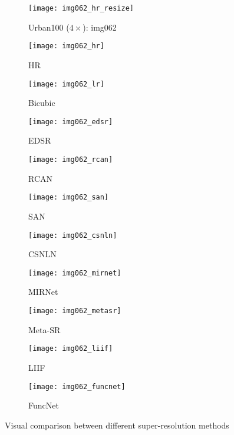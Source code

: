 \documentclass{article}
\begin{document}
{\begin{figure}
\begin{minipage}{1\textwidth}
\begin{minipage}{0.30\textwidth}
\begin{subfigure}{0.98\columnwidth}
\texttt{[image: img062\_hr\_resize]}
\caption*{Urban100 ($4\times$): img062}
\end{subfigure}
\end{minipage}
\begin{minipage}{0.70\textwidth}
\begin{subfigure}{0.19\columnwidth}
\texttt{[image: img062\_hr]}
\caption*{HR}
\end{subfigure}
\begin{subfigure}{0.19\columnwidth}
\texttt{[image: img062\_lr]}
\caption*{Bicubic}
\end{subfigure}
\begin{subfigure}{0.19\columnwidth}
\texttt{[image: img062\_edsr]}
\caption*{EDSR~\cite{lim2017enhanced}}
\end{subfigure}
\begin{subfigure}{0.19\columnwidth}
\texttt{[image: img062\_rcan]}
\caption*{RCAN~\cite{zhang2018image}}
\end{subfigure}
\begin{subfigure}{0.19\columnwidth}
\texttt{[image: img062\_san]}
\caption*{SAN~\cite{dai2019second}}
\end{subfigure}

\begin{subfigure}{0.19\columnwidth}
\texttt{[image: img062\_csnln]}
\caption*{CSNLN~\cite{mei2020image}}
\end{subfigure}
\begin{subfigure}{0.19\columnwidth}
\texttt{[image: img062\_mirnet]}
\caption*{MIRNet~\cite{zamir2020learning}}
\end{subfigure}
\begin{subfigure}{0.19\columnwidth}
\texttt{[image: img062\_metasr]}
\caption*{Meta-SR~\cite{hu2019meta}}
\end{subfigure}
\begin{subfigure}{0.19\columnwidth}
\texttt{[image: img062\_liif]}
\caption*{LIIF~\cite{chen2021learning}}
\end{subfigure}
\begin{subfigure}{0.19\columnwidth}
\texttt{[image: img062\_funcnet]}
\caption*{FuncNet}
\end{subfigure}
\end{minipage}
\end{minipage}
\caption{Visual comparison between different super-resolution methods}
\label{fig:2}
\bigskip


\end{figure}}
\end{document}

